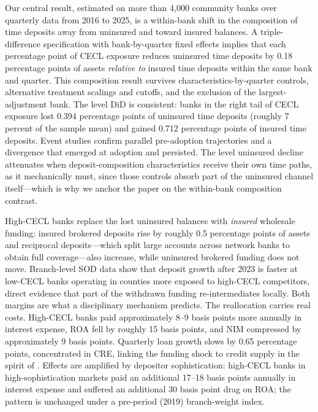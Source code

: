Our central result, estimated on more than 4,000 community banks over
quarterly data from 2016 to 2025, is a within-bank shift in the
composition of time deposits away from uninsured and toward insured
balances.  A triple-difference specification with bank-by-quarter fixed
effects implies that each percentage point of CECL exposure reduces
uninsured time deposits by 0.18 percentage points of assets
\emph{relative to} insured time deposits within the same bank and
quarter.  This composition result survives characteristics-by-quarter
controls, alternative treatment scalings and cutoffs, and the exclusion
of the largest-adjustment bank.  The level DiD is consistent: banks in
the right tail of CECL exposure lost 0.394 percentage points of
uninsured time deposits (roughly 7 percent of the sample mean) and
gained 0.712 percentage points of insured time deposits.  Event studies
confirm parallel pre-adoption trajectories and a divergence that emerged
at adoption and persisted.  The level uninsured decline attenuates when
deposit-composition characteristics receive their own time paths, as it
mechanically must, since those controls absorb part of the uninsured
channel itself---which is why we anchor the paper on the within-bank
composition contrast.

High-CECL banks replace the lost uninsured balances with \emph{insured}
wholesale funding: insured brokered deposits rise by roughly 0.5
percentage points of assets and reciprocal deposits---which split large
accounts across network banks to obtain full coverage---also increase,
while uninsured brokered funding does not move.  Branch-level SOD data
show that deposit growth after 2023 is faster at low-CECL banks
operating in counties more exposed to high-CECL competitors, direct
evidence that part of the withdrawn funding re-intermediates locally.
Both margins are what a disciplinary mechanism predicts.  The
reallocation carries real costs.  High-CECL banks paid approximately
8--9 basis points more annually in interest expense, ROA fell by
roughly 15 basis points, and NIM compressed by approximately 9 basis
points.  Quarterly loan growth slows by 0.65 percentage points,
concentrated in CRE, linking the funding shock to credit supply in the
spirit of \citet{granja2025current}.  Effects are amplified by depositor
sophistication: high-CECL banks in high-sophistication markets paid an
additional 17--18 basis points annually in interest expense and
suffered an additional 30 basis point drag on ROA; the pattern is
unchanged under a pre-period (2019) branch-weight index.

